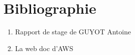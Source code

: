 \documentclass[
11pt, %
french, %
singlespacing, %
headsepline, %
]{MastersDoctoralThesis} %
\begin{document}



%
%
%


\chapter*{Bibliographie}
\begin{enumerate}
\item  Rapport de stage de GUYOT Antoine
\item  La web doc d'AWS
\end{enumerate}


\end{document}
